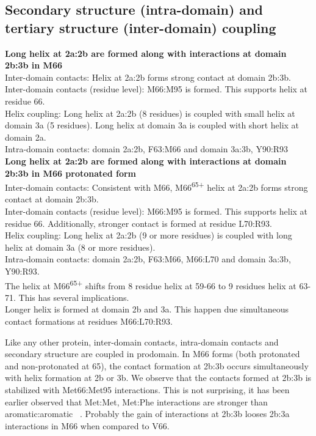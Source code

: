 \documentclass[journal=jacsat,manuscript=article]{achemso}
\begin{document}
\subsection{Secondary structure (intra-domain) and tertiary structure (inter-domain) coupling} 
\textbf{Long helix at 2a:2b are formed along with interactions at domain 2b:3b in M66}\\
Inter-domain contacts: Helix at 2a:2b forms strong contact at domain 2b:3b.\\
Inter-domain contacts (residue level): M66:M95 is formed. This supports helix at residue 66.\\
Helix coupling: Long helix at 2a:2b (8 residues) is coupled with small helix at domain 3a (5 residues). Long helix at domain 3a is coupled with short helix at domain 2a. \\
Intra-domain contacts: domain 2a:2b, F63:M66 and domain 3a:3b, Y90:R93\\
\textbf{Long helix at 2a:2b are formed along with interactions at domain 2b:3b in M66 protonated form}\\
Inter-domain contacts: Consistent with M66,  M66\textsuperscript{65+} helix at 2a:2b forms strong contact at domain 2b:3b.\\
Inter-domain contacts (residue level): M66:M95 is formed. This supports helix at residue 66. Additionally, stronger contact is formed at residue L70:R93. \\
Helix coupling: Long helix at 2a:2b (9 or more residues) is coupled with long helix at domain 3a (8 or more residues).\\
Intra-domain contacts: domain 2a:2b, F63:M66, M66:L70 and domain 3a:3b, Y90:R93. \\
The helix at M66\textsuperscript{65+} shifts from 8 residue helix at 59-66 to 9 residues helix at 63-71. This has several implications.\\
Longer helix is formed at domain 2b and 3a. This happen due simultaneous contact formations at residues M66:L70:R93.

Like any other protein, inter-domain contacts, intra-domain contacts and secondary structure are coupled in prodomain. In M66 forms (both protonated and non-protonated at 65), the contact formation at 2b:3b occurs simultaneously with helix formation at 2b or 3b. 
We observe that the contacts formed at  2b:3b is stabilized with Met66:Met95 interactions. This is not surprising, it has been earlier observed that Met:Met, Met:Phe interactions are stronger than aromatic:aromatic ~\cite {Gomez-Tamayo2016}. 
Probably the gain of interactions at 2b:3b looses 2b:3a interactions in M66 when compared to V66.
\end{document}
